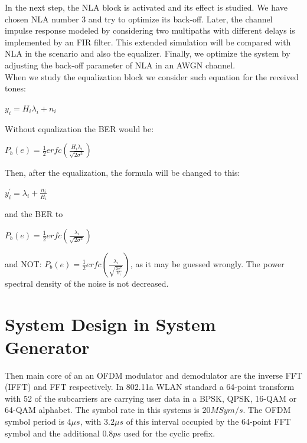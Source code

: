 In the next step, the NLA block is activated and its effect is studied. We have chosen NLA number 3 and try to optimize its back-off.
Later, the channel impulse response modeled by considering two multipaths with different delays is implemented by an FIR filter. This extended simulation will be compared with NLA in the scenario and also the equalizer. Finally, we optimize the system by adjusting the back-off parameter of NLA in an AWGN channel.\\
When we study the equalization block we consider such equation for the received tones:
\begin{center}
$y_{i}= H_{i} \lambda_{i} + n_{i}$\\
\end{center}
Without equalization the BER would be:
\begin{center}
$P_{b}(e)= \frac{1}{2}erfc(\frac{H_{i} \lambda_{i}}{\sqrt{2 \sigma^{2}}})$\\
\end{center}
Then, after the equalization, the formula will be changed to this:\\
\begin{center}
$y^{\prime}_{i}= \lambda_{i} + \frac{n_{i}}{H_{i}}$\\
\end{center}
and the BER to
\begin{center}
 $P_{b}(e)= \frac{1}{2}erfc(\frac{\lambda_{i}}{\sqrt{2 \sigma^{2}}})$\\
\end{center}
and NOT: $P_{b}(e)= \frac{1}{2}erfc(\frac{\lambda_{i}}{\sqrt{\frac{2 \sigma^{2}}{H_{i}}}})$, as it may be guessed wrongly. The power spectral density of the noise is not decreased.
\section{System Design in System Generator}
\label{sec_anasim}

Then main core of an an OFDM modulator and demodulator are the inverse FFT (IFFT) and FFT respectively. In 802.11a WLAN standard a 64-point transform with 52 of the subcarriers are carrying user data in a BPSK,
QPSK, 16-QAM or 64-QAM alphabet. The symbol rate in this systems is $20 MSym/s$. The OFDM symbol period
is $4 \mu s$, with $3.2 \mu s$ of this interval occupied by the 64-point FFT symbol and the additional $0.8 ps$ used for the cyclic prefix.\\

